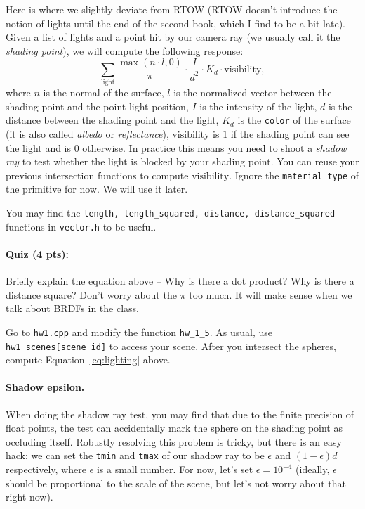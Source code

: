 Here is where we slightly deviate from RTOW (RTOW doesn't introduce the notion of lights until the end of the second book, which I find to be a bit late). Given a list of lights and a point hit by our camera ray (we usually call it the \emph{shading point}), we will compute the following response:
\begin{equation}
    \sum_{\text{light}} \frac{\max\left(n \cdot l, 0\right)}{\pi} \cdot \frac{I}{d^2} \cdot K_d \cdot \text{visibility},
    \label{eq:lighting}
\end{equation}
where $n$ is the normal of the surface, $l$ is the normalized vector between the shading point and the point light position, $I$ is the intensity of the light, $d$ is the distance between the shading point and the light, $K_d$ is the \lstinline{color} of the surface (it is also called \emph{albedo} or \emph{reflectance}), $\text{visibility}$ is $1$ if the shading point can see the light and is $0$ otherwise. In practice this means you need to shoot a \emph{shadow ray} to test whether the light is blocked by your shading point. You can reuse your previous intersection functions to compute $\text{visibility}$. Ignore the \lstinline{material_type} of the primitive for now. We will use it later.

You may find the \lstinline{length, length_squared, distance, distance_squared} functions in \lstinline{vector.h} to be useful.

\paragraph{Quiz (4 pts):} Briefly explain the equation above -- Why is there a dot product? Why is there a distance square? Don't worry about the $\pi$ too much. It will make sense when we talk about BRDFs in the class.

Go to \lstinline{hw1.cpp} and modify the function \lstinline{hw_1_5}. As usual, use \lstinline{hw1_scenes[scene_id]} to access your scene. After you intersect the spheres, compute Equation~\eqref{eq:lighting} above.

\paragraph{Shadow epsilon.} When doing the shadow ray test, you may find that due to the finite precision of float points, the test can accidentally mark the sphere on the shading point as occluding itself. Robustly resolving this problem is tricky, but there is an easy hack: we can set the \lstinline{tmin} and \lstinline{tmax} of our shadow ray to be $\epsilon$ and $\left(1 - \epsilon\right) d$ respectively, where $\epsilon$ is a small number. For now, let's set $\epsilon = 10^{-4}$ (ideally, $\epsilon$ should be proportional to the scale of the scene, but let's not worry about that right now).

